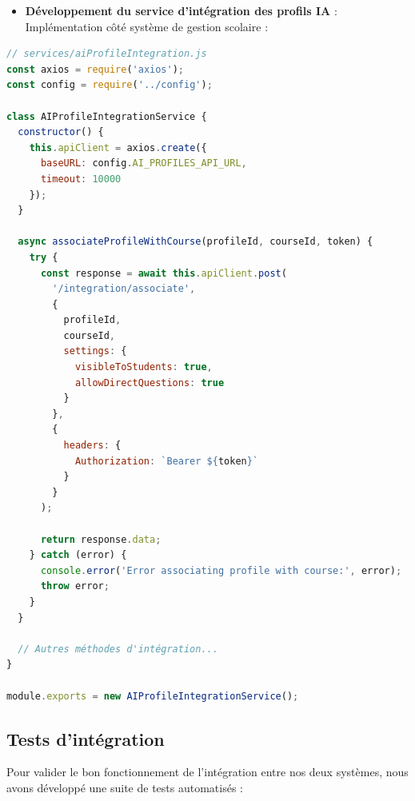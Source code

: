 \begin{itemize}
  \item \textbf{Développement du service d'intégration des profils IA} : Implémentation côté système de gestion scolaire :
\end{itemize}

\begin{lstlisting}[style=codestyle, language=JavaScript]
// services/aiProfileIntegration.js
const axios = require('axios');
const config = require('../config');

class AIProfileIntegrationService {
  constructor() {
    this.apiClient = axios.create({
      baseURL: config.AI_PROFILES_API_URL,
      timeout: 10000
    });
  }

  async associateProfileWithCourse(profileId, courseId, token) {
    try {
      const response = await this.apiClient.post(
        '/integration/associate',
        {
          profileId,
          courseId,
          settings: {
            visibleToStudents: true,
            allowDirectQuestions: true
          }
        },
        {
          headers: {
            Authorization: `Bearer ${token}`
          }
        }
      );
      
      return response.data;
    } catch (error) {
      console.error('Error associating profile with course:', error);
      throw error;
    }
  }
  
  // Autres méthodes d'intégration...
}

module.exports = new AIProfileIntegrationService();
\end{lstlisting}

\subsection{Tests d'intégration}

Pour valider le bon fonctionnement de l'intégration entre nos deux systèmes, nous avons développé une suite de tests automatisés :

